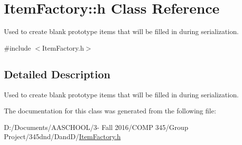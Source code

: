 \hypertarget{class_item_factory_1_1h}{}\section{Item\+Factory\+:\+:h Class Reference}
\label{class_item_factory_1_1h}


Used to create blank prototype items that will be filled in during serialization.  




{\ttfamily \#include $<$Item\+Factory.\+h$>$}



\subsection{Detailed Description}
Used to create blank prototype items that will be filled in during serialization. 

The documentation for this class was generated from the following file\+:\begin{DoxyCompactItemize}
\item 
D\+:/\+Documents/\+A\+A\+S\+C\+H\+O\+O\+L/3-\/ Fall 2016/\+C\+O\+M\+P 345/\+Group Project/345dnd/\+Dand\+D/\hyperlink{_item_factory_8h}{Item\+Factory.\+h}\end{DoxyCompactItemize}
